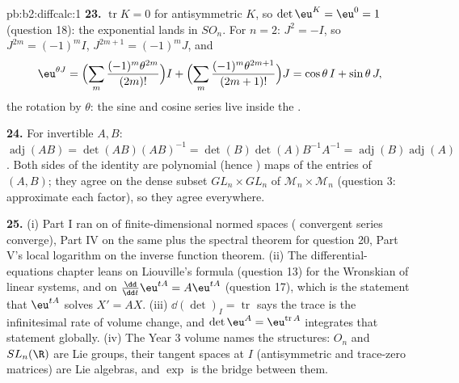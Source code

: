 \begin{solution}{pb:b2:diffcalc:1}
\textbf{23.} $\operatorname{tr}K = 0$ for antisymmetric $K$,
so $\det\eu^K = \eu^0 = 1$ (question 18): the exponential
lands in $SO_n$. For $n = 2$: $J^2 = -I$, so $J^{2m} =
(-1)^mI$, $J^{2m+1} = (-1)^mJ$, and
\[
\eu^{\theta J}
= \Bigl(\sum_m\frac{(-1)^m\theta^{2m}}{(2m)!}\Bigr)I
+ \Bigl(\sum_m\frac{(-1)^m\theta^{2m+1}}{(2m+1)!}\Bigr)J
= \cos\theta\,I + \sin\theta\,J ,
\]
the rotation by $\theta$: the sine and cosine series live
inside the .

\textbf{24.} For invertible $A, B$: $\operatorname{adj}(AB) =
\det(AB)(AB)^{-1} = \det(B)\det(A)B^{-1}A^{-1} =
\operatorname{adj}(B)\operatorname{adj}(A)$. Both sides of the
identity are polynomial (hence ) maps of the entries
of $(A, B)$; they agree on the dense subset $GL_n\times GL_n$
of $\mathcal M_n\times\mathcal M_n$ (question 3: approximate
each factor), so they agree everywhere.

\textbf{25.} (i) Part I ran on  of finite-dimensional
normed spaces ( convergent series converge), Part IV
on the same plus the spectral theorem for question 20, Part V's
local logarithm on the inverse function theorem. (ii) The
differential-equations chapter leans on Liouville's formula
(question 13) for the Wronskian of linear systems, and on
$\frac{\dd}{\dd t}\eu^{tA} = A\eu^{tA}$ (question 17), which is
the statement that $\eu^{tA}$ solves $X' = AX$. (iii)
$\dd(\det)_I = \operatorname{tr}$ says the trace is the
infinitesimal rate of volume change, and $\det\eu^A =
\eu^{\operatorname{tr}A}$ integrates that statement globally.
(iv) The Year 3 volume names the structures: $O_n$ and
$SL_n(\R)$ are Lie groups, their tangent spaces at $I$
(antisymmetric and trace-zero matrices) are Lie algebras, and
$\exp$ is the bridge between them.
\end{solution}
